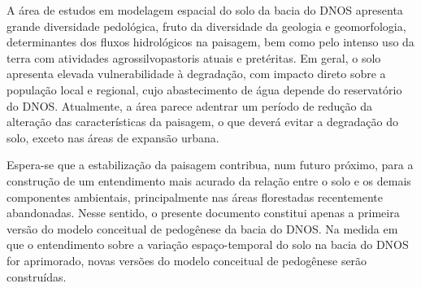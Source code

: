 A área de estudos em modelagem espacial do solo da bacia do DNOS apresenta grande diversidade pedológica, 
fruto da diversidade da geologia e geomorfologia, determinantes dos fluxos hidrológicos na paisagem, bem como 
pelo intenso uso da terra com atividades agrossilvopastoris atuais e pretéritas. Em geral, o solo apresenta 
elevada vulnerabilidade à degradação, com impacto direto sobre a população local e regional, cujo 
abastecimento de água depende do reservatório do DNOS. Atualmente, a área parece adentrar um período de 
redução 
da alteração das características da paisagem, o que deverá evitar a degradação do solo, exceto nas áreas de 
expansão urbana.

Espera-se que a estabilização da paisagem contribua, num futuro próximo, para a construção de um entendimento 
mais acurado da relação entre o solo e os demais componentes ambientais, principalmente nas áreas florestadas 
recentemente abandonadas. Nesse sentido, o presente documento constitui apenas a primeira versão do modelo 
conceitual de pedogênese da bacia do DNOS. Na medida em que o entendimento sobre a variação espaço-temporal do 
solo na bacia do DNOS for aprimorado, novas versões do modelo conceitual de pedogênese serão construídas.



